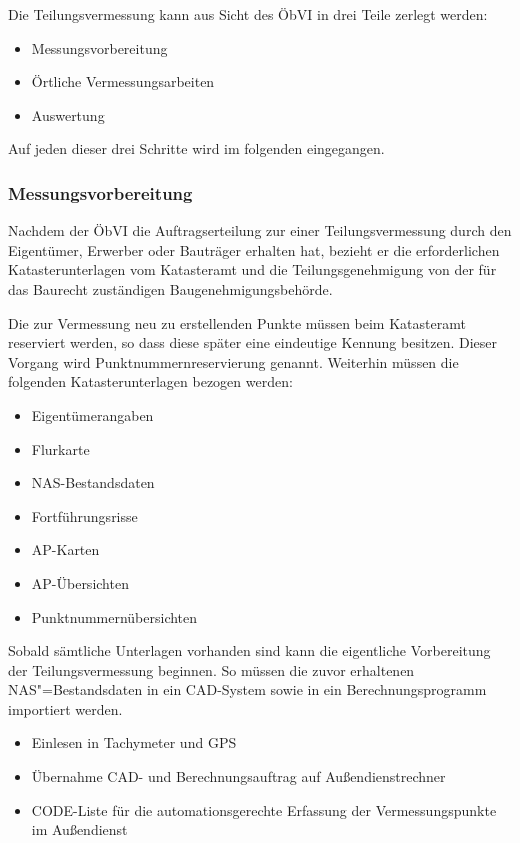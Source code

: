 Die Teilungsvermessung kann aus Sicht des \ac{ÖbVI} in drei Teile zerlegt werden:
\begin{itemize}
	\item Messungsvorbereitung
	\item Örtliche Vermessungsarbeiten
	\item Auswertung
\end{itemize}

Auf jeden dieser drei Schritte wird im folgenden eingegangen.

\subsubsection{Messungsvorbereitung}

Nachdem der \ac{ÖbVI} die Auftragserteilung zur einer Teilungsvermessung durch den Eigentümer, Erwerber oder Bauträger erhalten hat, bezieht er die erforderlichen Katasterunterlagen vom Katasteramt und die Teilungsgenehmigung von der für das Baurecht zuständigen Baugenehmigungsbehörde.

Die zur Vermessung neu zu erstellenden Punkte müssen beim Katasteramt reserviert werden, so dass diese später eine eindeutige Kennung besitzen. Dieser Vorgang wird Punktnummernreservierung genannt. Weiterhin müssen die folgenden Katasterunterlagen bezogen werden:
\begin{itemize}
	\item Eigentümerangaben
	\item Flurkarte
	\item NAS-Bestandsdaten
	\item Fortführungsrisse
	\item AP-Karten
	\item AP-Übersichten
	\item Punktnummernübersichten
\end{itemize}
Sobald sämtliche Unterlagen vorhanden sind kann die eigentliche Vorbereitung der Teilungsvermessung beginnen. So müssen die zuvor erhaltenen NAS"=Bestandsdaten in ein CAD-System sowie in ein Berechnungsprogramm importiert werden.
\begin{itemize}
	\item Einlesen in Tachymeter und GPS
	\item Übernahme CAD- und Berechnungsauftrag auf Außendienstrechner
	\item CODE-Liste für die automationsgerechte Erfassung der Vermessungspunkte im Außendienst
\end{itemize}

